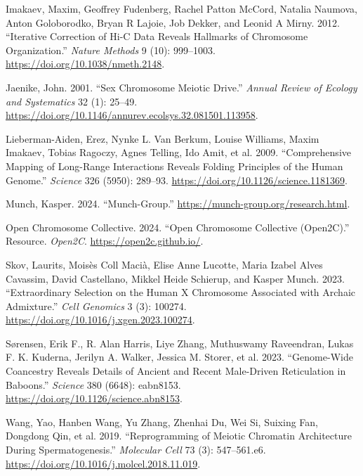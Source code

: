 \documentclass[
  a4paper,
]{scrbook}
\newlength{\cslhangindent}
\newenvironment{CSLReferences}[2] %
 {\begin{list}{}{%
  \setlength{\itemindent}{0pt}
  \setlength{\leftmargin}{0pt}
  \setlength{\parsep}{0pt}
  \ifodd #1
   \setlength{\leftmargin}{\cslhangindent}
   \setlength{\itemindent}{-1\cslhangindent}
  \fi
  \setlength{\itemsep}{#2\baselineskip}}}
 {\end{list}}
\let\oldemph\emph
\renewcommand\emph[1]{\oldemph{\color{gray}#1}}
\begin{document}
\begingroup
\raggedright

\label{refs}
\begin{CSLReferences}{1}{0}
Imakaev, Maxim, Geoffrey Fudenberg, Rachel Patton McCord, Natalia
Naumova, Anton Goloborodko, Bryan R Lajoie, Job Dekker, and Leonid A
Mirny. 2012. {``Iterative Correction of {Hi}-{C} Data Reveals Hallmarks
of Chromosome Organization.''} \emph{Nature Methods} 9 (10): 999--1003.
\url{https://doi.org/10.1038/nmeth.2148}.

Jaenike, John. 2001. {``Sex {Chromosome} {Meiotic} {Drive}.''}
\emph{Annual Review of Ecology and Systematics} 32 (1): 25--49.
\url{https://doi.org/10.1146/annurev.ecolsys.32.081501.113958}.

Lieberman-Aiden, Erez, Nynke L. Van Berkum, Louise Williams, Maxim
Imakaev, Tobias Ragoczy, Agnes Telling, Ido Amit, et al. 2009.
{``Comprehensive {Mapping} of {Long}-{Range} {Interactions} {Reveals}
{Folding} {Principles} of the {Human} {Genome}.''} \emph{Science} 326
(5950): 289--93. \url{https://doi.org/10.1126/science.1181369}.

Munch, Kasper. 2024. {``Munch-Group.''}
\url{https://munch-group.org/research.html}.

Open Chromosome Collective. 2024. {``Open {Chromosome} {Collective}
({Open2C}).''} Resource. \emph{Open2C}. \url{https://open2c.github.io/}.

Skov, Laurits, Moisès Coll Macià, Elise Anne Lucotte, Maria Izabel Alves
Cavassim, David Castellano, Mikkel Heide Schierup, and Kasper Munch.
2023. {``Extraordinary Selection on the Human {X} Chromosome Associated
with Archaic Admixture.''} \emph{Cell Genomics} 3 (3): 100274.
\url{https://doi.org/10.1016/j.xgen.2023.100274}.

Sørensen, Erik F., R. Alan Harris, Liye Zhang, Muthuswamy Raveendran,
Lukas F. K. Kuderna, Jerilyn A. Walker, Jessica M. Storer, et al. 2023.
{``Genome-Wide Coancestry Reveals Details of Ancient and Recent
Male-Driven Reticulation in Baboons.''} \emph{Science} 380 (6648):
eabn8153. \url{https://doi.org/10.1126/science.abn8153}.

Wang, Yao, Hanben Wang, Yu Zhang, Zhenhai Du, Wei Si, Suixing Fan,
Dongdong Qin, et al. 2019. {``Reprogramming of {Meiotic} {Chromatin}
{Architecture} During {Spermatogenesis}.''} \emph{Molecular Cell} 73
(3): 547--561.e6. \url{https://doi.org/10.1016/j.molcel.2018.11.019}.

\end{CSLReferences}

\endgroup


\backmatter
\end{document}
